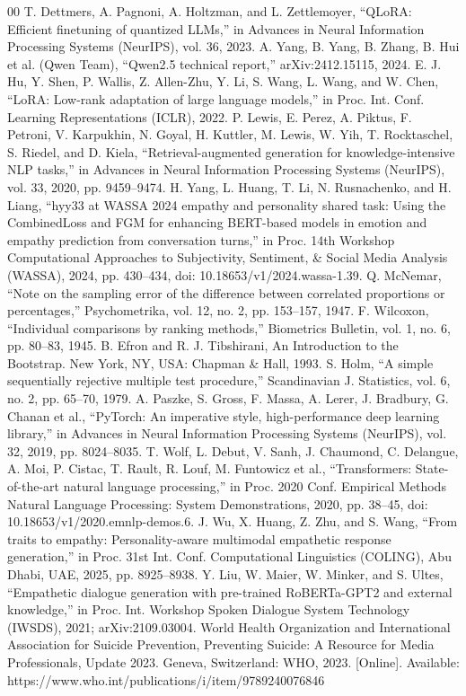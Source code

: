 \documentclass[conference,a4paper]{IEEEtran}
\begin{document}
\begin{thebibliography}{00}
 T. Dettmers, A. Pagnoni, A. Holtzman, and L. Zettlemoyer, ``QLoRA: Efficient finetuning of quantized LLMs,'' in Advances in Neural Information Processing Systems (NeurIPS), vol. 36, 2023.
 A. Yang, B. Yang, B. Zhang, B. Hui et al. (Qwen Team), ``Qwen2.5 technical report,'' arXiv:2412.15115, 2024.
 E. J. Hu, Y. Shen, P. Wallis, Z. Allen-Zhu, Y. Li, S. Wang, L. Wang, and W. Chen, ``LoRA: Low-rank adaptation of large language models,'' in Proc. Int. Conf. Learning Representations (ICLR), 2022.
 P. Lewis, E. Perez, A. Piktus, F. Petroni, V. Karpukhin, N. Goyal, H. Kuttler, M. Lewis, W. Yih, T. Rocktaschel, S. Riedel, and D. Kiela, ``Retrieval-augmented generation for knowledge-intensive NLP tasks,'' in Advances in Neural Information Processing Systems (NeurIPS), vol. 33, 2020, pp. 9459--9474.
 H. Yang, L. Huang, T. Li, N. Rusnachenko, and H. Liang, ``hyy33 at WASSA 2024 empathy and personality shared task: Using the CombinedLoss and FGM for enhancing BERT-based models in emotion and empathy prediction from conversation turns,'' in Proc. 14th Workshop Computational Approaches to Subjectivity, Sentiment, \& Social Media Analysis (WASSA), 2024, pp. 430--434, doi: 10.18653/v1/2024.wassa-1.39.
 Q. McNemar, ``Note on the sampling error of the difference between correlated proportions or percentages,'' Psychometrika, vol. 12, no. 2, pp. 153--157, 1947.
 F. Wilcoxon, ``Individual comparisons by ranking methods,'' Biometrics Bulletin, vol. 1, no. 6, pp. 80--83, 1945.
 B. Efron and R. J. Tibshirani, An Introduction to the Bootstrap. New York, NY, USA: Chapman \& Hall, 1993.
 S. Holm, ``A simple sequentially rejective multiple test procedure,'' Scandinavian J. Statistics, vol. 6, no. 2, pp. 65--70, 1979.
 A. Paszke, S. Gross, F. Massa, A. Lerer, J. Bradbury, G. Chanan et al., ``PyTorch: An imperative style, high-performance deep learning library,'' in Advances in Neural Information Processing Systems (NeurIPS), vol. 32, 2019, pp. 8024--8035.
 T. Wolf, L. Debut, V. Sanh, J. Chaumond, C. Delangue, A. Moi, P. Cistac, T. Rault, R. Louf, M. Funtowicz et al., ``Transformers: State-of-the-art natural language processing,'' in Proc. 2020 Conf. Empirical Methods Natural Language Processing: System Demonstrations, 2020, pp. 38--45, doi: 10.18653/v1/2020.emnlp-demos.6.
 J. Wu, X. Huang, Z. Zhu, and S. Wang, ``From traits to empathy: Personality-aware multimodal empathetic response generation,'' in Proc. 31st Int. Conf. Computational Linguistics (COLING), Abu Dhabi, UAE, 2025, pp. 8925--8938.
 Y. Liu, W. Maier, W. Minker, and S. Ultes, ``Empathetic dialogue generation with pre-trained RoBERTa-GPT2 and external knowledge,'' in Proc. Int. Workshop Spoken Dialogue System Technology (IWSDS), 2021; arXiv:2109.03004.
 World Health Organization and International Association for Suicide Prevention, Preventing Suicide: A Resource for Media Professionals, Update 2023. Geneva, Switzerland: WHO, 2023. [Online]. Available: https://www.who.int/publications/i/item/9789240076846
\end{thebibliography}
\end{document}
